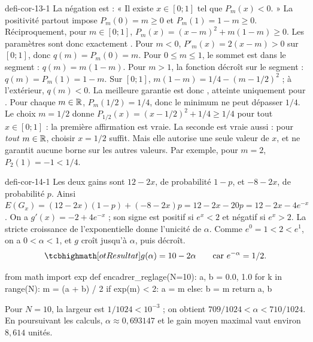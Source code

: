 \begin{blocEdition}{defi-cor-13-1}
La négation est : « Il existe $x\in[0;1]$ tel que $P_m(x)<0$. »
La positivité partout impose $P_m(0)=m\geq0$ et $P_m(1)=1-m\geq0$.
Réciproquement, pour $m\in[0;1]$,
$P_m(x)=(x-m)^2+m(1-m)\geq0$. Les paramètres sont donc exactement .
Pour $m<0$, $P'_m(x)=2(x-m)>0$ sur $[0;1]$, donc $q(m)=P_m(0)=m$.
Pour $0\leq m\leq1$, le sommet est dans le segment : $q(m)=m(1-m)$.
Pour $m>1$, la fonction décroît sur le segment : $q(m)=P_m(1)=1-m$.
Sur $[0;1]$, $m(1-m)=1/4-(m-1/2)^2$ ; à l'extérieur, $q(m)<0$.
La meilleure garantie est donc , atteinte uniquement pour .
Pour chaque $m\in\mathbb{R}$, $P_m(1/2)=1/4$, donc le minimum ne peut dépasser $1/4$.
Le choix $m=1/2$ donne $P_{1/2}(x)=(x-1/2)^2+1/4\geq1/4$ pour tout $x\in[0;1]$ :
la première affirmation est vraie.
La seconde est vraie aussi : pour \emph{tout} $m\in\mathbb{R}$, choisir $x=1/2$ suffit.
Mais elle autorise une seule valeur de $x$, et ne garantit aucune borne sur les autres valeurs.
Par exemple, pour $m=2$, $P_2(1)=-1<1/4$.
\end{blocEdition}

\begin{blocEdition}{defi-cor-14-1}
Les deux gains sont $12-2x$, de probabilité $1-p$, et $-8-2x$, de probabilité $p$.
Ainsi $E(G_x)=(12-2x)(1-p)+(-8-2x)p=12-2x-20p=12-2x-4e^{-x}$.
On a $g'(x)=-2+4e^{-x}$ ; son signe est positif si $e^x<2$ et négatif si $e^x>2$.
La stricte croissance de l'exponentielle donne l'unicité de $\alpha$.
Comme $e^0=1<2<e^1$, on a $0<\alpha<1$, et $g$ croît jusqu'à $\alpha$, puis décroît.
\[\res{g(\alpha)=10-2\alpha}\qquad\text{car }e^{-\alpha}=1/2.\]
\begin{python}
from math import exp
def encadrer_reglage(N=10):
    a, b = 0.0, 1.0
    for k in range(N):
        m = (a + b) / 2
        if exp(m) < 2:
            a = m
        else:
            b = m
    return a, b
\end{python}
Pour $N=10$, la largeur est $1/1024<10^{-3}$ ; on obtient
$709/1024<\alpha<710/1024$. En poursuivant les calculs, $\alpha\approx0{,}693147$
et le gain moyen maximal vaut environ $8{,}614$ unités.
\end{blocEdition}

